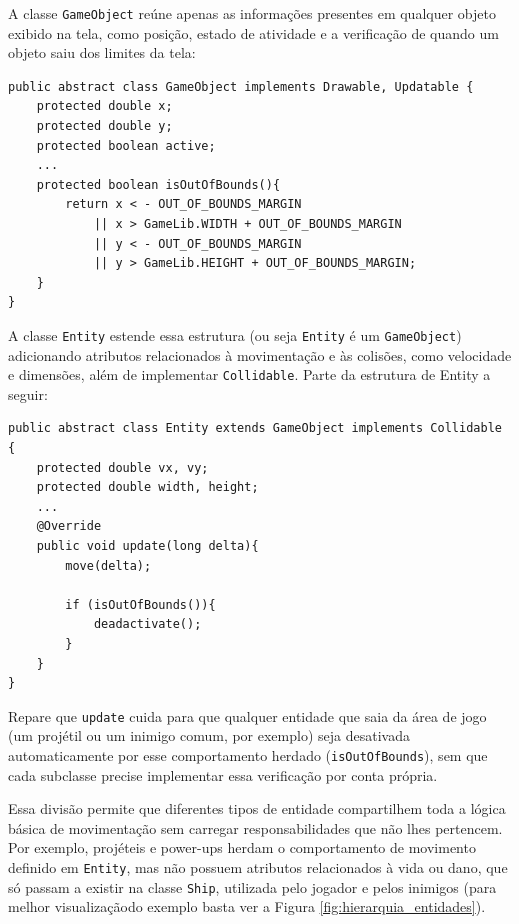 A classe \texttt{GameObject} reúne apenas as informações presentes em qualquer
objeto exibido na tela, como posição, estado de atividade e a verificação de
quando um objeto saiu dos limites da tela:

\begin{lstlisting}[caption={Responsabilidades mínimas comuns a qualquer objeto do jogo (GameObject.java)}]
public abstract class GameObject implements Drawable, Updatable {
    protected double x;
    protected double y;
    protected boolean active;
    ...
    protected boolean isOutOfBounds(){
        return x < - OUT_OF_BOUNDS_MARGIN
            || x > GameLib.WIDTH + OUT_OF_BOUNDS_MARGIN
            || y < - OUT_OF_BOUNDS_MARGIN
            || y > GameLib.HEIGHT + OUT_OF_BOUNDS_MARGIN;
    }
}
\end{lstlisting}

A classe \texttt{Entity} estende essa estrutura (ou seja \texttt{Entity} é um \texttt{GameObject}) adicionando atributos
relacionados à movimentação e às colisões, como velocidade e dimensões, além de
implementar \texttt{Collidable}. Parte da estrutura de Entity a seguir:

\begin{lstlisting}[caption={\texttt{Entity} reparoveita isOutOfBounds() da sua superclasse (Entity.java)}]
public abstract class Entity extends GameObject implements Collidable {
    protected double vx, vy;
    protected double width, height;
    ...
    @Override
    public void update(long delta){
        move(delta);

        if (isOutOfBounds()){
            deadactivate();
        }
    }
}
\end{lstlisting}

Repare que \texttt{update} cuida para que qualquer entidade
que saia da área de jogo (um projétil ou um inimigo comum, por exemplo) seja
desativada automaticamente por esse comportamento herdado (\texttt{isOutOfBounds}), sem que cada
subclasse precise implementar essa verificação por conta própria.

Essa divisão permite que diferentes tipos de entidade compartilhem toda a lógica
básica de movimentação sem carregar responsabilidades que não lhes pertencem.
Por exemplo, projéteis e power-ups herdam o comportamento de movimento definido
em \texttt{Entity}, mas não possuem atributos relacionados à vida ou dano, que
só passam a existir na classe \texttt{Ship}, utilizada pelo jogador e pelos
inimigos (para melhor visualizaçãodo exemplo basta ver a Figura \ref{fig:hierarquia_entidades}).


